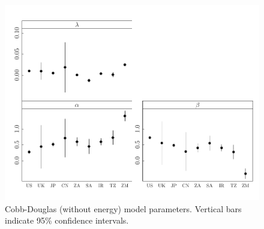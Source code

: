 \documentclass[preprint,authoryear,12pt]{elsarticle}\usepackage{graphicx, color}
\makeatletter
\def\maxwidth{ %
  \ifdim\Gin@nat@width>\linewidth
    \linewidth
  \else
    \Gin@nat@width
  \fi
}
\newenvironment{knitrout}{}{} %
\makeatother
\begin{document}
\begin{knitrout}
\color{fgcolor}\begin{figure}[]

\includegraphics[width=\maxwidth]{figure/CD_Params_Graph} \caption[Cobb-Douglas (without energy) model parameters]{Cobb-Douglas (without energy) model parameters. Vertical bars indicate 95\% confidence intervals.\label{fig:CD_Params_Graph}}
\end{figure}


\end{knitrout}
\end{document}
